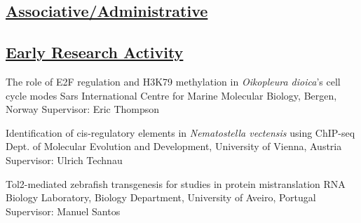 \documentclass[11pt,a4paper,roman]{moderncv} %
\begin{document}
    \subsection{\underline{Associative/Administrative}}

    \subsection{\underline{Early Research Activity}}

            {The role of E2F regulation and H3K79 methylation in \textit{Oikopleura dioica}'s cell cycle modes}
            {Sars International Centre for Marine Molecular Biology, Bergen, Norway}{}
            {}
            {Supervisor: Eric Thompson}

            {Identification of cis-regulatory elements in \textit{Nematostella vectensis} using ChIP-seq}
            {Dept. of Molecular Evolution and Development, University of Vienna, Austria}{}
            {}
            {Supervisor: Ulrich Technau}

            {Tol2-mediated zebrafish transgenesis for studies in protein mistranslation}
            {RNA Biology Laboratory, Biology Department, University of Aveiro, Portugal}{}
            {}
            {Supervisor: Manuel Santos}
\end{document}
